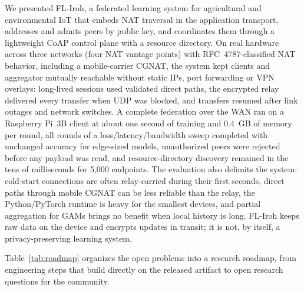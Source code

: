 \documentclass[a4paper,fleqn]{cas-dc}
\begin{document}
We presented FL-Iroh, a federated learning system for agricultural and environmental IoT that embeds NAT traversal in the application transport, addresses and admits peers by public key, and coordinates them through a lightweight CoAP control plane with a resource directory. On real hardware across three networks (four NAT vantage points) with RFC~4787-classified NAT behavior, including a mobile-carrier CGNAT, the system kept clients and aggregator mutually reachable without static IPs, port forwarding or VPN overlays: long-lived sessions used validated direct paths, the encrypted relay delivered every transfer when UDP was blocked, and transfers resumed after link outages and network switches. A complete federation over the WAN ran on a Raspberry Pi~3B client at about one second of training and 0.4~GB of memory per round, all rounds of a loss/latency/bandwidth sweep completed with unchanged accuracy for edge-sized models, unauthorized peers were rejected before any payload was read, and resource-directory discovery remained in the tens of milliseconds for 5{,}000 endpoints. The evaluation also delimits the system: cold-start connections are often relay-carried during their first seconds, direct paths through mobile CGNAT can be less reliable than the relay, the Python/PyTorch runtime is heavy for the smallest devices, and partial aggregation for GAMs brings no benefit when local history is long. FL-Iroh keeps raw data on the device and encrypts updates in transit; it is not, by itself, a privacy-preserving learning system.

Table~\ref{tab:roadmap} organizes the open problems into a research roadmap, from engineering steps that build directly on the released artifact to open research questions for the community.
\end{document}
